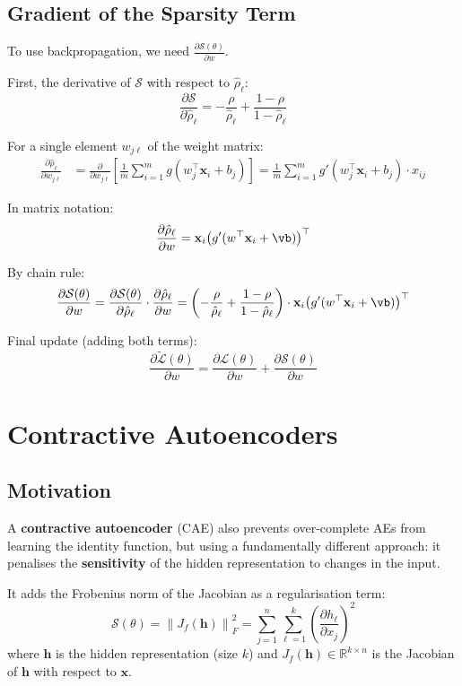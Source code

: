 \documentclass[12pt,a4paper]{article}
\newcommand{\R}{\mathbb{R}}
\newcommand{\norm}[1]{\left\|#1\right\|}
\newcommand{\vx}{\mathbf{x}}
\newcommand{\vh}{\mathbf{h}}
\newcommand{\Loss}{\mathcal{L}}
\newcommand{\Reg}{\mathcal{S}}
\begin{document}
\subsection{Gradient of the Sparsity Term}

To use backpropagation, we need $\frac{\partial\Reg(\theta)}{\partial w}$.

First, the derivative of $\Reg$ with respect to $\hat{\rho}_\ell$:
\[
\frac{\partial\Reg}{\partial\hat{\rho}_\ell}
= -\frac{\rho}{\hat{\rho}_\ell} + \frac{1-\rho}{1-\hat{\rho}_\ell}
\]

For a single element $w_{j\ell}$ of the weight matrix:
\begin{align*}
\frac{\partial\hat{\rho}_\ell}{\partial w_{j\ell}}
&= \frac{\partial}{\partial w_{j\ell}}\left[\frac{1}{m}\sum_{i=1}^{m}g(w_j^\top\vx_i + b_j)\right]
= \frac{1}{m}\sum_{i=1}^{m}g'(w_j^\top\vx_i + b_j)\cdot x_{ij}
\end{align*}

In matrix notation:
\[
\frac{\partial\hat{\rho}_\ell}{\partial w}
= \vx_i\bigl(g'(w^\top\vx_i + \vb)\bigr)^\top
\]

By chain rule:
\[
\frac{\partial\Reg(\theta)}{\partial w}
= \frac{\partial\Reg(\theta)}{\partial\hat{\rho}_\ell}
  \cdot \frac{\partial\hat{\rho}_\ell}{\partial w}
= \left(-\frac{\rho}{\hat{\rho}_\ell} + \frac{1-\rho}{1-\hat{\rho}_\ell}\right)
  \cdot \vx_i\bigl(g'(w^\top\vx_i + \vb)\bigr)^\top
\]

Final update (adding both terms):
\[
\frac{\partial\tilde{\Loss}(\theta)}{\partial w}
= \frac{\partial\Loss(\theta)}{\partial w}
+ \frac{\partial\Reg(\theta)}{\partial w}
\]

\section{Contractive Autoencoders}

\subsection{Motivation}

A \textbf{contractive autoencoder} (CAE) also prevents over-complete AEs from learning the identity function, but using a fundamentally different approach: it penalises the \textbf{sensitivity} of the hidden representation to changes in the input.

It adds the Frobenius norm of the Jacobian as a regularisation term:
\[
\Reg(\theta) = \norm{J_f(\vh)}_F^2
= \sum_{j=1}^{n}\sum_{\ell=1}^{k}
  \left(\frac{\partial h_\ell}{\partial x_j}\right)^2
\]
where $\vh$ is the hidden representation (size $k$) and $J_f(\vh) \in \R^{k\times n}$ is the Jacobian of $\vh$ with respect to $\vx$.
\end{document}
